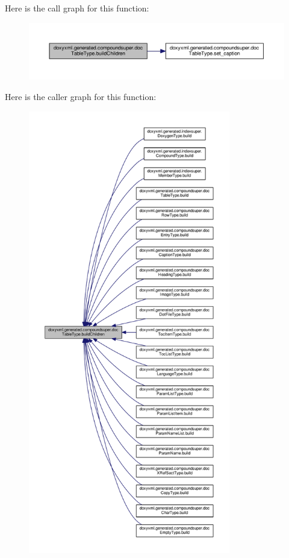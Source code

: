 Here is the call graph for this function\+:
\nopagebreak
\begin{figure}[H]
\begin{center}
\leavevmode
\includegraphics[width=350pt]{d9/d0e/classdoxyxml_1_1generated_1_1compoundsuper_1_1docTableType_afba414d310a118fd9bbae81ea17deef4_cgraph}
\end{center}
\end{figure}




Here is the caller graph for this function\+:
\nopagebreak
\begin{figure}[H]
\begin{center}
\leavevmode
\includegraphics[height=550pt]{d9/d0e/classdoxyxml_1_1generated_1_1compoundsuper_1_1docTableType_afba414d310a118fd9bbae81ea17deef4_icgraph}
\end{center}
\end{figure}


